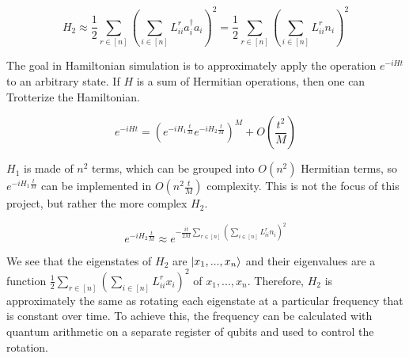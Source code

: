 \documentclass{article}
\begin{document}
\begin{equation}
    H_2 \approx \frac{1}{2}\sum_{r \in [n]} (\sum_{i \in [n]} L^r_{ii}a_i^\dag a_i)^2 = \frac{1}{2}\sum_{r \in [n]} (\sum_{i \in [n]} L^r_{ii}n_i)^2
\end{equation}

The goal in Hamiltonian simulation is to approximately apply the operation $e^{-iHt}$ to an arbitrary state. If $H$ is a sum of Hermitian operations, then one can Trotterize the Hamiltonian.

\begin{equation}
    e^{-iHt} = (e^{-iH_1\frac{t}{M}}e^{-iH_2\frac{t}{M}})^{M} + O(\frac{t^2}{M})
\end{equation}

$H_1$ is made of $n^2$ terms, which can be grouped into $O(n^2)$ Hermitian terms, so $e^{-iH_1\frac{t}{M}}$ can be implemented in $O(n^2\frac{t}{M})$ complexity. This is not the focus of this project, but rather the more complex $H_2$.

\begin{equation}
    e^{-iH_2\frac{t}{M}} \approx e^{-\frac{it}{2M}\sum_{r \in [n]} (\sum_{i \in [n]} L^r_{ii}n_i)^2}
\end{equation}

We see that the eigenstates of $H_2$ are $\ket{x_1, ..., x_n}$ and their eigenvalues are a function $\frac{1}{2}\sum_{r \in [n]} (\sum_{i \in [n]} L^r_{ii}x_i)^2$ of $x_1, ..., x_n$. Therefore, $H_2$ is approximately the same as rotating each eigenstate at a particular frequency that is constant over time. To achieve this, the frequency can be calculated with quantum arithmetic on a separate register of qubits and used to control the rotation.
\end{document}
